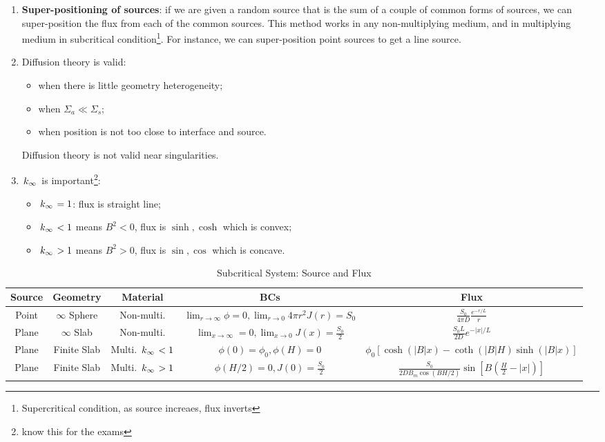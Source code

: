 \documentclass{school-22.211-notes}
\begin{document}
\clearpage
{}
\begin{enumerate}
\item \textbf{Super-positioning of sources}: if we are given a random source that is the sum of a couple of common forms of sources, we can super-position the flux from each of the common sources. This method works in any non-multiplying medium, and in multiplying medium in subcritical condition\footnote{Supercritical condition, as source increaes, flux inverts}. For instance, we can super-position point sources to get a line source. 

\item Diffusion theory is valid: 
  \begin{itemize}
    \item when there is little geometry heterogeneity;
    \item when $\Sigma_a \ll \Sigma_s$;
    \item when position is not too close to interface and source.
  \end{itemize}
  Diffusion theory is not valid near singularities. 

\item $\left. k_{\infty} \right.$ is important\footnote{know this for the exams}: 
  \begin{itemize}
  \item $\left. k_{\infty} \right. = 1$: flux is straight line;
  \item $\left. k_{\infty} \right. < 1$ means $B^2 < 0$, flux is $\sinh, \cosh$ which is convex; 
  \item $\left. k_{\infty} \right. > 1$ means $B^2 > 0$, flux is $\sin, \cos$ which is concave. 
  \end{itemize}
\end{enumerate}

  \begin{table}[ht]
    \centering
    \begin{tabular}{|c|c|c|c|c|} \hline
      Source & Geometry & Material &BCs & Flux \\ \hline \hline
      Point & $\infty$ Sphere & Non-multi.  & $\displaystyle \lim_{r\to\infty} \phi = 0, \lim_{r\to 0} 4 \pi r^2 J(r) = S_0$ & $\displaystyle \frac{S_0}{4\pi D} \frac{e^{-r/L}}{r}$ \\ \hline
      Plane & $\infty$ Slab & Non-multi. &$\displaystyle \lim_{x\to \infty} = 0, \lim_{x \to 0} J(x)  = \frac{S_0}{2}$ & $\displaystyle \frac{S_0 L}{2D} e^{-|x|/L}$ \\ \hline
      Plane & Finite Slab &Multi. $\left. k_{\infty} \right. < 1$ & $\phi(0) = \phi_0, \phi(H) = 0$ & $\displaystyle \phi_0 \left[ \cosh(|B|x) - \coth(|B|H) \sinh(|B| x) \right]$ \\ \hline
      Plane & Finite Slab &Multi. $\left. k_{\infty} \right. > 1$ & $\displaystyle \phi(H/2) = 0, J(0) = \frac{S_0}{2}$ & $\displaystyle \frac{S_0}{2D B_m \cos (BH/2)} \sin \left[ B \left( \frac{H}{2} - |x| \right) \right]$ \\ \hline
    \end{tabular}
    \caption{Subcritical System: Source and Flux} 
  \end{table}
\end{document}
